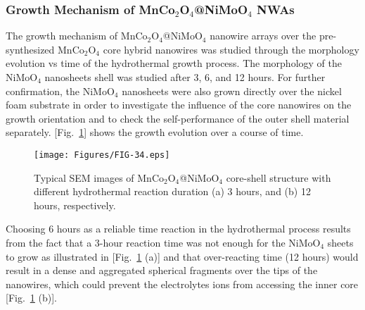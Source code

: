 \documentclass[reprint,amsmath,amssymb,aps,floatfix,
]{revtex4-2}
\begin{document}
\subsubsection{Growth Mechanism of MnCo$_2$O$_4$@NiMoO$_4$ NWAs}
The growth mechanism of MnCo$_2$O$_4$@NiMoO$_4$ nanowire arrays over the pre-synthesized MnCo$_2$O$_4$ core hybrid nanowires was studied through the morphology evolution vs time of the hydrothermal growth process. The morphology of the NiMoO$_4$ nanosheets shell was studied after 3, 6, and 12 hours. For further confirmation, the NiMoO$_4$ nanosheets were also grown directly over the nickel foam substrate in order to investigate the influence of the core nanowires on the growth orientation and to check the self-performance of the outer shell material separately. [Fig.~\ref{fig:fig34}] shows the growth evolution over a course of time.
\begin{figure}[b]
    \centering
    \texttt{[image: Figures/FIG-34.eps]}
    \caption{\label{fig:fig34}Typical SEM images of MnCo$_2$O$_4$@NiMoO$_4$ core-shell structure with different hydrothermal reaction duration (a) 3 hours, and (b) 12 hours, respectively.}
    \end{figure}
Choosing 6 hours as a reliable time reaction in the hydrothermal process results from the fact that a 3-hour reaction time was not enough for the NiMoO$_4$ sheets to grow as illustrated in [Fig.~\ref{fig:fig34} (a)] and that over-reacting time (12 hours) would result in a dense and aggregated spherical fragments over the tips of the nanowires, which could prevent the electrolytes ions from accessing the inner core [Fig.~\ref{fig:fig34} (b)].
\end{document}
